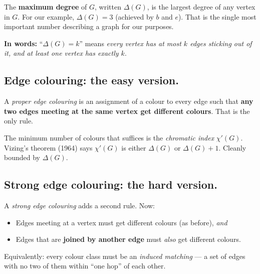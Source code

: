 \documentclass[11pt]{article}
\begin{document}
The \textbf{maximum degree} of $G$, written $\Delta(G)$, is the
largest degree of any vertex in $G$. For our example,
$\Delta(G) = 3$ (achieved by $b$ and $e$). That is the single most
important number describing a graph for our purposes.

\textbf{In words:} ``$\Delta(G) = k$'' means \emph{every vertex has
at most $k$ edges sticking out of it, and at least one vertex has
exactly $k$}.

\subsection*{Edge colouring: the easy version.}

A \emph{proper edge colouring} is an assignment of a colour to every
edge such that \textbf{any two edges meeting at the same vertex get
different colours}. That is the only rule.

\begin{center}
\end{center}

The minimum number of colours that suffices is the
\emph{chromatic index} $\chi'(G)$. Vizing's theorem (1964) says
$\chi'(G)$ is either $\Delta(G)$ or $\Delta(G) + 1$. Cleanly bounded
by $\Delta(G)$.

\subsection*{Strong edge colouring: the hard version.}

A \emph{strong edge colouring} adds a second rule. Now:
\begin{itemize}[leftmargin=*, itemsep=2pt]
  \item Edges meeting at a vertex must get different colours (as before), \emph{and}
  \item Edges that are \textbf{joined by another edge} must \emph{also} get different colours.
\end{itemize}
Equivalently: every colour class must be an \emph{induced matching}
--- a set of edges with no two of them within ``one hop'' of each
other.
\end{document}
